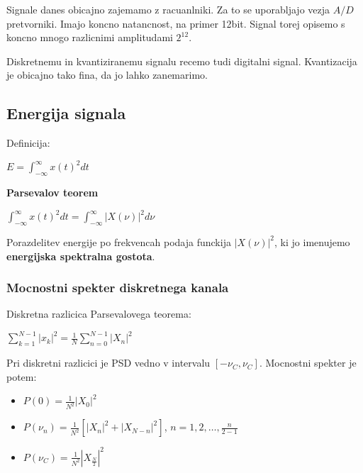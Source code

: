 \documentclass{article}
\begin{document}
\begin{multicols}{2}
	Signale danes obicajno zajemamo z racuanlniki. Za to se uporabljajo vezja $A/D$ pretvorniki. Imajo koncno natancnost,
	na primer 12bit. Signal torej opisemo s koncno mnogo razlicnimi amplitudami $2^{12}$.

	Diskretnemu in kvantiziranemu signalu recemo tudi digitalni signal. Kvantizacija je obicajno tako fina, da jo lahko zanemarimo.

	\subsection{Energija signala}
	Definicija:
	\begin{center}
		\begin{math}
			E = \int_{-\infty}^{\infty} x(t)^2 dt
		\end{math}
	\end{center}

	\textbf{Parsevalov teorem}
	\begin{center}
		\begin{math}
			\int_{-\infty}^{\infty} x(t)^2 dt = \int_{-\infty}^{\infty} |X(\nu)|^2 d\nu
		\end{math}
	\end{center}

	Porazdelitev energije po frekvencah podaja funckija $|X(\nu)|^2$, ki jo imenujemo \textbf{energijska spektralna gostota}.

	\subsubsection{Mocnostni spekter diskretnega kanala}
	Diskretna razlicica Parsevalovega teorema:
	\begin{center}
		\begin{math}
			\sum_{k=1}^{N-1} |x_k|^2 = \frac{1}{N} \sum_{n=0}^{N-1} |X_n|^2
		\end{math}
	\end{center}
	Pri diskretni razlicici je PSD vedno v intervalu $[- \nu_C, \nu_C]$.
	Mocnostni spekter je potem:
	\begin{itemize}
		\item $P(0) = \frac{1}{N^2} |X_0|^2$
		\item $P(\nu_n) = \frac{1}{N^2} [|X_n|^2 + |X_{N-n}|^2]$, $n = 1, 2, \dots, \frac{n}{2-1}$
		\item $P(\nu_C) = \frac{1}{N^2}|X_{\frac{N}{2}}|^2$
	\end{itemize}

\end{multicols}
\end{document}
